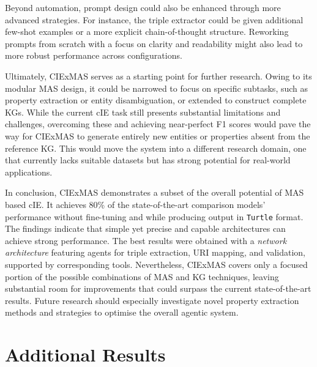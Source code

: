 \documentclass[a4paper,oneside,bibliography=totoc]{scrbook}
\begin{document}
Beyond automation, prompt design could also be enhanced through more advanced strategies. For instance, the triple extractor could be given additional few-shot examples or a more explicit chain-of-thought structure. Reworking prompts from scratch with a focus on clarity and readability might also lead to more robust performance across configurations.

Ultimately, CIExMAS serves as a starting point for further research. Owing to its modular \ac{MAS} design, it could be narrowed to focus on specific subtasks, such as property extraction or entity disambiguation, or extended to construct complete \acp{KG}. While the current \ac{cIE} task still presents substantial limitations and challenges, overcoming these and achieving near-perfect F1 scores would pave the way for CIExMAS to generate entirely new entities or properties absent from the reference \ac{KG}. This would move the system into a different research domain, one that currently lacks suitable datasets but has strong potential for real-world applications.

In conclusion, CIExMAS demonstrates a subset of the overall potential of \ac{MAS} based \ac{cIE}. It achieves 80\% of the state-of-the-art comparison models' performance without fine-tuning and while producing output in \texttt{Turtle} format. The findings indicate that simple yet precise and capable architectures can achieve strong performance. The best results were obtained with a \textit{network architecture} featuring agents for triple extraction, \ac{URI} mapping, and validation, supported by corresponding tools. Nevertheless, CIExMAS covers only a focused portion of the possible combinations of \ac{MAS} and \ac{KG} techniques, leaving substantial room for improvements that could surpass the current state-of-the-art results. Future research should especially investigate novel property extraction methods and strategies to optimise the overall agentic system.



\appendix

\chapter{Additional Results}
\label{ch:additional_material}
\end{document}
